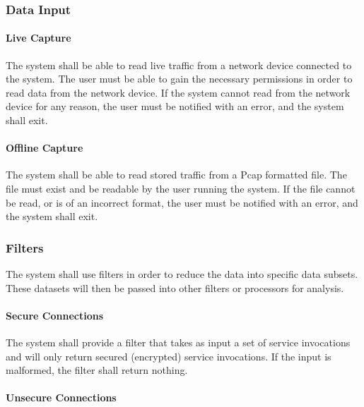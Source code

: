 \documentclass[titlepage]{article}
\begin{document}
\subsubsection{Data Input} \label{data_input}

\paragraph{Live Capture}

The system shall be able to read live traffic from a network device connected
to the system.  The user must be able to gain the necessary permissions in
order to read data from the network device.  If the system cannot read from the
network device for any reason, the user must be notified with an error, and the
system shall exit.

\paragraph{Offline Capture}

The system shall be able to read stored traffic from a Pcap formatted file.
The file must exist and be readable by the user running the system.  If the
file cannot be read, or is of an incorrect format, the user must be notified
with an error, and the system shall exit.


\subsubsection{Filters}
The system shall use filters in order to reduce the data into specific data
subsets.  These datasets will then be passed into other filters or
processors for analysis.

\paragraph{Secure Connections}

The system shall provide a filter that takes as input a set of service
invocations and will only return secured (encrypted) service invocations.  If
the input is malformed, the filter shall return nothing.

\paragraph{Unsecure Connections}
\end{document}
